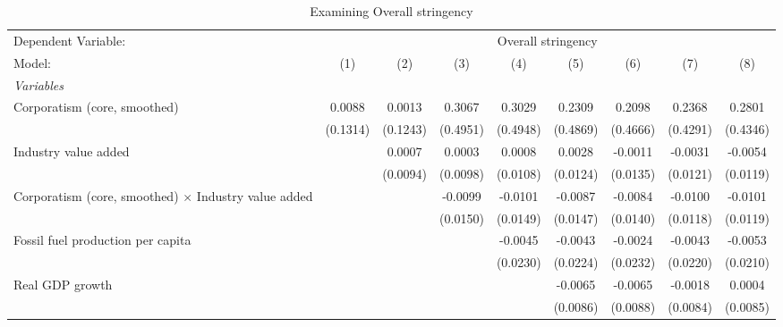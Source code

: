 
\begin{table}[htbp]
   \caption{Examining Overall stringency}
   \centering
   \begin{tabular}{lcccccccc}
      \tabularnewline \midrule \midrule
      Dependent Variable: & \multicolumn{8}{c}{Overall stringency}\\
      Model:                                                      & (1)                   & (2)      & (3)      & (4)      & (5)      & (6)      & (7)      & (8)\\  
      \midrule
      \emph{Variables}\\
      Corporatism (core, smoothed)                                & 0.0088                & 0.0013   & 0.3067   & 0.3029   & 0.2309   & 0.2098   & 0.2368   & 0.2801\\   
                                                                  & (0.1314)              & (0.1243) & (0.4951) & (0.4948) & (0.4869) & (0.4666) & (0.4291) & (0.4346)\\   
      Industry value added                                        &                       & 0.0007   & 0.0003   & 0.0008   & 0.0028   & -0.0011  & -0.0031  & -0.0054\\   
                                                                  &                       & (0.0094) & (0.0098) & (0.0108) & (0.0124) & (0.0135) & (0.0121) & (0.0119)\\   
      Corporatism (core, smoothed) $\times$ Industry value added  &                       &          & -0.0099  & -0.0101  & -0.0087  & -0.0084  & -0.0100  & -0.0101\\   
                                                                  &                       &          & (0.0150) & (0.0149) & (0.0147) & (0.0140) & (0.0118) & (0.0119)\\   
      Fossil fuel production per capita                           &                       &          &          & -0.0045  & -0.0043  & -0.0024  & -0.0043  & -0.0053\\   
                                                                  &                       &          &          & (0.0230) & (0.0224) & (0.0232) & (0.0220) & (0.0210)\\   
      Real GDP growth                                             &                       &          &          &          & -0.0065  & -0.0065  & -0.0018  & 0.0004\\   
                                                                  &                       &          &          &          & (0.0086) & (0.0088) & (0.0084) & (0.0085)\\   

\end{tabular}
\end{table}
